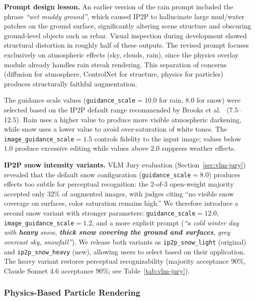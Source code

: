 \documentclass[12pt]{article}
\begin{document}
\textbf{Prompt design lesson.} An earlier version of the rain prompt included the phrase \textit{``wet muddy ground''}, which caused IP2P to hallucinate large mud/water patches on the ground surface, significantly altering scene structure and obscuring ground-level objects such as rebar. Visual inspection during development showed structural distortion in roughly half of these outputs. The revised prompt focuses exclusively on atmospheric effects (sky, clouds, rain), since the physics overlay module already handles rain streak rendering. This separation of concerns (diffusion for atmosphere, ControlNet for structure, physics for particles) produces structurally faithful augmentation.

The guidance scale values (\texttt{guidance\_scale}$=10.0$ for rain, $8.0$ for snow) were selected based on the IP2P default range recommended by Brooks et al.~\citep{brooks2023ip2p} ($7.5$--$12.5$). Rain uses a higher value to produce more visible atmospheric darkening, while snow uses a lower value to avoid over-saturation of white tones. The \texttt{image\_guidance\_scale}$=1.5$ controls fidelity to the input image; values below $1.0$ produce excessive editing while values above $2.0$ suppress weather effects.

\textbf{IP2P snow intensity variants.} VLM Jury evaluation (Section~\ref{sec:vlm-jury}) revealed that the default snow configuration (\texttt{guidance\_scale}$=8.0$) produces effects too subtle for perceptual recognition: the 2-of-3 open-weight majority accepted only 32\% of augmented images, with judges citing ``no visible snow coverage on surfaces, color saturation remains high.'' We therefore introduce a second snow variant with stronger parameters: \texttt{guidance\_scale}$=12.0$, \texttt{image\_guidance\_scale}$=1.2$, and a more explicit prompt (\textit{``a cold winter day with \textbf{heavy} snow, \textbf{thick snow covering the ground and surfaces}, grey overcast sky, snowfall''}). We release both variants as \texttt{ip2p\_snow\_light} (original) and \texttt{ip2p\_snow\_heavy} (new), allowing users to select based on their application. The heavy variant restores perceptual recognizability (majority acceptance 90\%, Claude Sonnet 4.6 acceptance 90\%; see Table~\ref{tab:vlm-jury}).

\subsubsection{Physics-Based Particle Rendering}
\label{subsec:physics-rendering}
\end{document}
